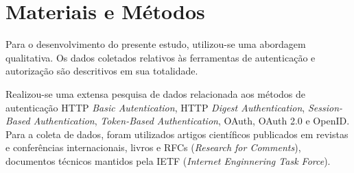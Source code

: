 \section{Materiais e Métodos}

Para o desenvolvimento do presente estudo, utilizou-se uma abordagem qualitativa. Os dados coletados relativos às ferramentas de autenticação e autorização são descritivos em sua totalidade.

Realizou-se uma extensa pesquisa de dados relacionada aos métodos de autenticação HTTP \emph{Basic Autentication}, HTTP \emph{Digest Authentication}, \emph{Session-Based Authentication}, \emph{Token-Based Authentication}, OAuth, OAuth 2.0 e OpenID. Para a coleta de dados, foram utilizados artigos científicos publicados em revistas e conferências internacionais, livros e RFCs (\emph{Research for Comments}), documentos técnicos mantidos pela IETF (\emph{Internet Enginnering Task Force}).